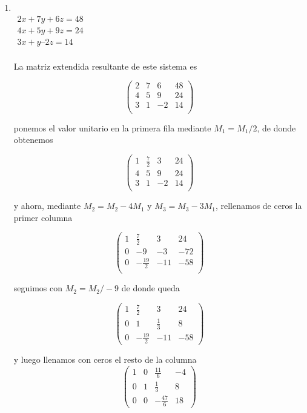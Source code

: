 \documentclass[11pt]{article}
\begin{document}
\begin{multicols}{2}
	\begin{enumerate}[\bf{Sistema} 1]

		\item 
			\ \\$\begin{matrix}
				2x + 7y + 6z = 48 \\
				4x + 5y + 9z = 24 \\
				3x +  y – 2z = 14 \\
			\end{matrix}$

			\par La matriz extendida resultante de este sistema es
			
			$$\begin{pmatrix}
				2 & 7 & 6 & 48 \\
				4 & 5 & 9 & 24 \\
				3 & 1 & -2 & 14 \\
			\end{pmatrix}$$
			
			ponemos el valor unitario en la primera fila mediante $M_1 = M_1 / 2$, de donde obtenemos
			
			$$\begin{pmatrix}
				1 & \frac{7}{2} & 3 & 24 \\
				4 & 5 & 9 & 24 \\
				3 & 1 & -2 & 14 \\
			\end{pmatrix}$$
			
			y ahora, mediante $M_2 = M_2 - 4M_1$ y $M_3 = M_3 - 3M_1$, rellenamos de ceros la primer columna

			$$\begin{pmatrix}
				1 & \frac{7}{2} & 3 & 24 \\
				0 & -9& -3 &-72 \\
				0 &-\frac{19}{2} &-11&-58 \\
			\end{pmatrix}$$
			
			seguimos con $M_2 = M_2 / -9$ de donde queda
			
			$$\left(\begin{array}{rrrr}
				1 & \frac{7}{2} & 3 & 24 \\
				0 & 1 & \frac{1}{3} & 8 \\
				0 & -\frac{19}{2} & -11 & -58
			\end{array}\right)$$
			
			y luego llenamos con ceros el resto de la columna
			$$\left(\begin{array}{rrrr}
				1 & 0 & \frac{11}{6} & -4 \\
				0 & 1 & \frac{1}{3} & 8 \\
				0 & 0 & -\frac{47}{6} & 18
			\end{array}\right)$$
			

\end{enumerate}
\end{multicols}
\end{document}
